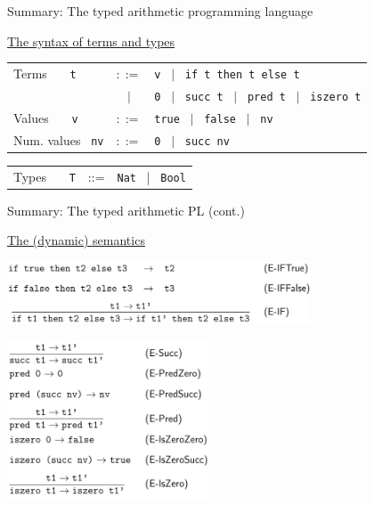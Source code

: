 \documentclass[table]{beamer}
\begin{document}
\begin{frame}[t]{Summary: The typed arithmetic programming language} \vspace{10pt}

\underline{The syntax of terms and types}

\vspace{10pt}

\begin{tabular}{l c l }
Terms \ \ \ \texttt{t} & $::=$ &
	\texttt{v} \ $|$ \ \texttt{if t then t else t} \\
	& $|$ & \texttt{0} \ $|$ \ \texttt{succ t} \ $|$ \ \texttt{pred t} \ $|$ \ \texttt{iszero t} \\
Values \ \ \  \texttt{v} & $::=$ & \texttt{true} \ $|$ \ \texttt{false} \ $|$ \ \texttt{nv}\\
Num. values \ \texttt{nv} & $::=$ & \texttt{0} \ $|$ \ \texttt{succ nv}
\end{tabular}

\vspace{20pt}

\begin{tabular}{l c l }
Types \ \ \ \texttt{T} & ::= & \texttt{Nat} \ | \  \texttt{Bool} 
\end{tabular}

\end{frame}

\begin{frame}[t]{Summary: The typed arithmetic PL (cont.)} 

\underline{The (dynamic) semantics}

\begin{center}
\includegraphics[width=9cm]{evaluation_bool_ch3}
\end{center}

\begin{center}
\includegraphics[width=6cm]{evaluation_numeric_ch3}
\end{center}

\end{frame}
\end{document}
